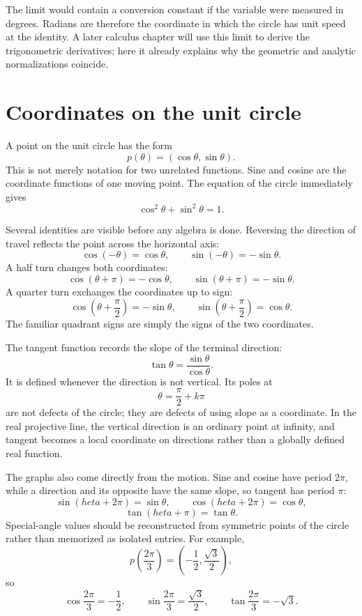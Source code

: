 The limit would contain a conversion constant if the variable were measured in degrees.  Radians are therefore the coordinate in which the circle has unit speed at the identity.  A later calculus chapter will use this limit to derive the trigonometric derivatives; here it already explains why the geometric and analytic normalizations coincide.

\section{Coordinates on the unit circle}

A point on the unit circle has the form
\[
  p(\theta)=(\cos\theta,\sin\theta).
\]
This is not merely notation for two unrelated functions.  Sine and cosine are the coordinate functions of one moving point.  The equation of the circle immediately gives
\[
  \cos^2\theta+\sin^2\theta=1.
\]

Several identities are visible before any algebra is done.  Reversing the direction of travel reflects the point across the horizontal axis:
\[
  \cos(-\theta)=\cos\theta,
  \qquad
  \sin(-\theta)=-\sin\theta.
\]
A half turn changes both coordinates:
\[
  \cos(\theta+\pi)=-\cos\theta,
  \qquad
  \sin(\theta+\pi)=-\sin\theta.
\]
A quarter turn exchanges the coordinates up to sign:
\[
  \cos\left(\theta+\frac\pi2\right)=-\sin\theta,
  \qquad
  \sin\left(\theta+\frac\pi2\right)=\cos\theta.
\]
The familiar quadrant signs are simply the signs of the two coordinates.

The tangent function records the slope of the terminal direction:
\[
  \tan\theta=\frac{\sin\theta}{\cos\theta}.
\]
It is defined whenever the direction is not vertical.  Its poles at
\[
  \theta=\frac\pi2+k\pi
\]
are not defects of the circle; they are defects of using slope as a coordinate.  In the real projective line, the vertical direction is an ordinary point at infinity, and tangent becomes a local coordinate on directions rather than a globally defined real function.

The graphs also come directly from the motion.  Sine and cosine have period \(2\pi\), while a direction and its opposite have the same slope, so tangent has period \(\pi\):
\[
  \sin(	heta+2\pi)=\sin\theta,
  \qquad
  \cos(	heta+2\pi)=\cos\theta,
\]
\[
  \tan(	heta+\pi)=\tan\theta.
\]
Special-angle values should be reconstructed from symmetric points of the circle rather than memorized as isolated entries.  For example,
\[
  p\left(\frac{2\pi}{3}\right)
  =\left(-\frac12,\frac{\sqrt3}{2}\right),
\]
so
\[
  \cos\frac{2\pi}{3}=-\frac12,
  \qquad
  \sin\frac{2\pi}{3}=\frac{\sqrt3}{2},
  \qquad
  \tan\frac{2\pi}{3}=-\sqrt3.
\]

